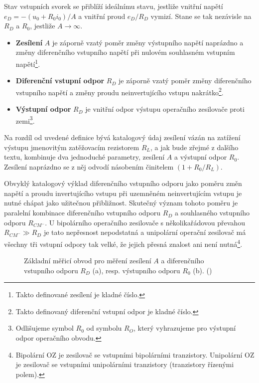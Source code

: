         Stav vstupních svorek se přiblíží ideálnímu stavu, jestliže vnitřní napětí \(e_D = - (u_0 +
        R_0i_0)/A\) a vnitřní proud \(e_D /R_D\) vymizí. Stane se tak nezávisle na \(R_D\) a
        \(R_0\), jestliže \(A\rightarrow\infty\).
        \begin{itemize}[noitemsep]
          \item \textbf{Zesílení} \(A\) je záporně vzatý poměr změny výstupního napětí naprázdno a
                změny diferenčního vstupního napětí při nulovém souhlasném vstupním
                napětí\footnote{Takto definované zesílení je kladné číslo.}.
          \item \textbf{Diferenční vstupní odpor} \(R_D\) je záporně vzatý poměr změny diferenčního
                vstupního napětí a změny proudu neinvertujícího vstupu nakrátko\footnote{Takto
                definovaný diferenční vstupní odpor je kladné číslo.}.
          \item \textbf{Výstupní odpor} \(R_D\) je vnitřní odpor výstupu operačního zesilovače proti
                zemi\footnote{Odlišujeme symbol \(R_0\) od symbolu \(R_O\), který vyhrazujeme pro
                výstupní odpor operačního obvodu.}.
        \end{itemize}

        Na rozdíl od uvedené definice bývá katalogový údaj zesílení vázán na zatížení výstupu
        jmenovitým zatěžovacím rezistorem \(R_L\), a jak bude zřejmé z dalšího textu, kombinuje dva
        jednoduché parametry, zesílení \(A\) a výstupní odpor \(R_0\). Zesílení naprázdno se z něj
        odvodí násobením činitelem \((1 + R_0 /R_L)\).

        Obvyklý katalogový výklad diferenčního vstupního odporu jako poměru změn napětí a proudu
        invertujícího vstupu při uzemněném neinvertujícím vstupu je nutné chápat jako užitečnou
        přibližnost. Skutečný význam tohoto poměru je paralelní kombinace diferenčního vstupního
        odporu \(R_D\) a souhlasného vstupního odporu \(R_{CM^-}\). U bipolárního operačního
        zesilovače s několikařádovou převahou \(R_{CM^-} \gg R_D\) je tato nepřesnost nepodstatná a
        unipolární operační zesilovač má všechny tři vstupní odpory tak velké, že jejich přesná
        znalost ani není nutná\footnote{Bipolární OZ je zesilovač se vstupními bipolárními
        tranzistory. Unipolární OZ je zesilovač se vstupními unipolárními tranzistory (tranzistory
        řízenými polem).}.

        \begin{figure}[ht!]  %
          \centering
            \hspace{1em}                                                       
          \caption{Základní měřicí obvod pro měření zesílení \(A\) a diferenčního vstupního odporu
                  \(R_D\) (a), resp. výstupního odporu \(R_0\) (b). (\cite[s.~23]{Dostal})}
          \label{aes:fig051}
        \end{figure}

